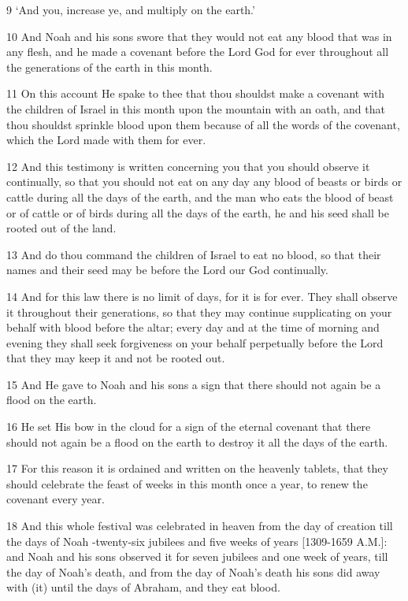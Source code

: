 \par 9 ‘And you, increase ye, and multiply on the earth.’
\par 10 And Noah and his sons swore that they would not eat any blood that was in any flesh, and he made a covenant before the Lord God for ever throughout all the generations of the earth in this month.
\par 11 On this account He spake to thee that thou shouldst make a covenant with the children of Israel in this month upon the mountain with an oath, and that thou shouldst sprinkle blood upon them because of all the words of the covenant, which the Lord made with them for ever.
\par 12 And this testimony is written concerning you that you should observe it continually, so that you should not eat on any day any blood of beasts or birds or cattle during all the days of the earth, and the man who eats the blood of beast or of cattle or of birds during all the days of the earth, he and his seed shall be rooted out of the land.
\par 13 And do thou command the children of Israel to eat no blood, so that their names and their seed may be before the Lord our God continually.
\par 14 And for this law there is no limit of days, for it is for ever. They shall observe it throughout their generations, so that they may continue supplicating on your behalf with blood before the altar; every day and at the time of morning and evening they shall seek forgiveness on your behalf perpetually before the Lord that they may keep it and not be rooted out.
\par 15 And He gave to Noah and his sons a sign that there should not again be a flood on the earth.
\par 16 He set His bow in the cloud for a sign of the eternal covenant that there should not again be a flood on the earth to destroy it all the days of the earth.
\par 17 For this reason it is ordained and written on the heavenly tablets, that they should celebrate the feast of weeks in this month once a year, to renew the covenant every year.
\par 18 And this whole festival was celebrated in heaven from the day of creation till the days of Noah -twenty-six jubilees and five weeks of years [1309-1659 A.M.]: and Noah and his sons observed it for seven jubilees and one week of years, till the day of Noah's death, and from the day of Noah's death his sons did away with (it) until the days of Abraham, and they eat blood.
